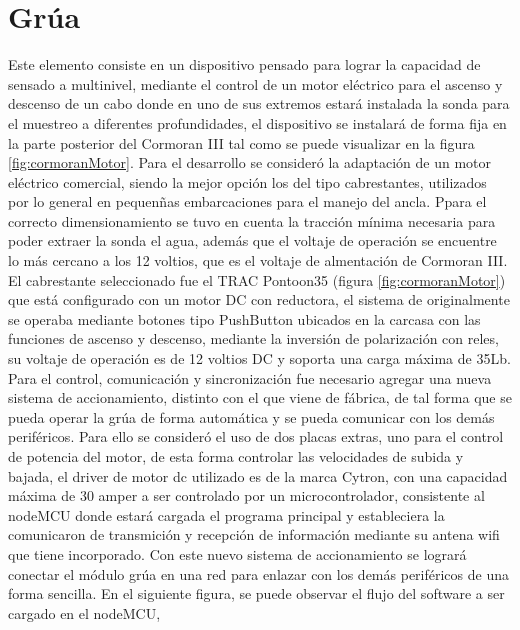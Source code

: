 \section{Gr\'ua}
Este elemento consiste en un dispositivo pensado para lograr la capacidad de sensado a multinivel, mediante el control de un motor el\'ectrico para el ascenso y descenso de un cabo donde en uno de sus extremos estar\'a instalada la sonda para el  muestreo a diferentes profundidades, el dispositivo se instalar\'a de forma fija en la parte posterior del Cormoran III tal como se puede visualizar en la figura \ref{fig:cormoranMotor}.
Para el desarrollo se consider\'o la adaptaci\'on de un motor el\'ectrico comercial, siendo la mejor opci\'on los del tipo cabrestantes, utilizados por lo general en pequen\~nas embarcaciones para el manejo del ancla. Ppara el correcto dimensionamiento se tuvo en cuenta la tracci\'on m\'inima necesaria para poder extraer la sonda el agua, adem\'as que el voltaje de operaci\'on se encuentre lo m\'as cercano a los 12 voltios, que es el voltaje de almentaci\'on de Cormoran III.
El cabrestante seleccionado fue el TRAC Pontoon35 (figura \ref{fig:cormoranMotor}) que est\'a configurado con un motor DC con reductora, el sistema de originalmente se operaba mediante botones tipo PushButton ubicados en la carcasa con las funciones de ascenso y descenso, mediante la inversi\'on de polarizaci\'on con reles, su voltaje de operaci\'on es de 12 voltios DC y soporta una carga m\'axima de 35Lb.
Para el control, comunicaci\'on y sincronización fue necesario agregar una nueva sistema de accionamiento, distinto con el que viene de fábrica, de tal forma que se pueda operar la gr\'ua de forma autom\'atica y se pueda comunicar con los dem\'as perif\'ericos. 
Para ello se consideró el uso de dos placas extras, uno para el control de potencia del motor, de esta forma controlar las velocidades de subida y bajada, el driver de motor dc utilizado es de la marca Cytron, con una capacidad m\'axima de 30 amper a ser controlado por un microcontrolador, consistente al nodeMCU donde estar\'a cargada el programa principal y estableciera la comunicaron de transmici\'on y recepción de informaci\'on mediante su antena wifi que tiene incorporado. 
Con este nuevo sistema de accionamiento se logrará conectar el módulo gr\'ua en una red para enlazar con los dem\'as perif\'ericos de una forma sencilla.
En el siguiente figura, se puede observar el flujo del software a ser cargado en el nodeMCU,

